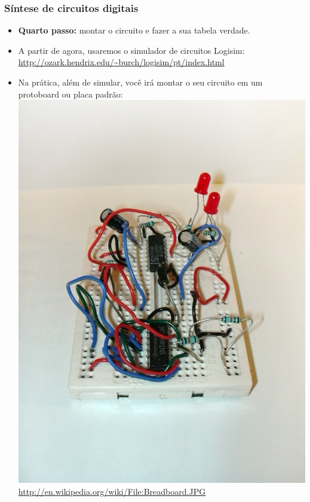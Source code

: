 \documentclass{beamer}
\begin{document}
\begin{frame}
\begin{center}
%
\end{center}

\end{frame}


\begin{frame}
\frametitle{Síntese de circuitos digitais}

\begin{itemize}
\item \textbf{Quarto passo: } montar o circuito e fazer a sua tabela verdade.

\pause

\item A partir de agora, usaremos o simulador de circuitos Logisim:\\
      \url{http://ozark.hendrix.edu/~burch/logisim/pt/index.html}

\pause

\item Na prática, além de simular, você irá montar o seu circuito em um protoboard ou placa padrão:\\
\includegraphics[width=20ex]{images/breadboard}\hspace{5ex}
{\color{gray}\tiny\url{http://en.wikipedia.org/wiki/File:Breadboard.JPG}}

\end{itemize}

\end{frame}
\end{document}
